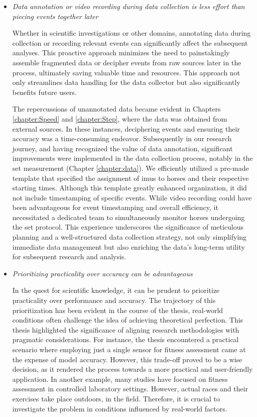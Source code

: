 \begin{itemize}[label={$\bullet$}, leftmargin=*]
\item{\textit{Data annotation or video recording during data collection is less effort than piecing events together later}} 

Whether in scientific investigations or other domains, annotating data during collection or recording relevant events can significantly affect the subsequent analyses. This proactive approach minimizes the need to painstakingly assemble fragmented data or decipher events from raw sources later in the process, ultimately saving valuable time and resources. This approach not only streamlines data handling for the data collector but also significantly benefits future users. 

The repercussions of unannotated data became evident in Chapters \ref{chapter:Speed} and \ref{chapter:Step}, where the data was obtained from external sources. In these instances, deciphering events and ensuring their accuracy was a time-consuming endeavor. Subsequently in our research journey, and having recognized the value of data annotation, significant improvements were implemented in the data collection process, notably in the \gls{set} measurement (Chapter \ref{chapter:data}). We efficiently utilized a pre-made template that specified the assignment of \gls{imu}s to horses and their respective starting times. Although this template greatly enhanced organization, it did not include timestamping of specific events. While video recording could have been advantageous for event timestamping and overall efficiency, it necessitated a dedicated team to simultaneously monitor horses undergoing the \gls{set} protocol. This experience underscores the significance of meticulous planning and a well-structured data collection strategy, not only simplifying immediate data management but also enriching the data's long-term utility for subsequent research and analysis.

\item{\textit{Prioritizing practicality over accuracy can be advantageous}} 

In the quest for scientific knowledge, it can be prudent to prioritize practicality over performance and accuracy. The trajectory of this prioritization has been evident in the course of the thesis, real-world conditions often challenge the idea of achieving theoretical perfection. This thesis highlighted the significance of aligning research methodologies with pragmatic considerations. For instance, the thesis encountered a practical scenario where employing just a single sensor for fitness assessment came at the expense of model accuracy. However, this trade-off proved to be a wise decision, as it rendered the process towards a more practical and user-friendly application. In another example, many studies have focused on fitness assessment in controlled laboratory settings. However, actual races and their exercises take place outdoors, in the field. Therefore, it is crucial to investigate the problem in conditions influenced by real-world factors. 


\end{itemize}
